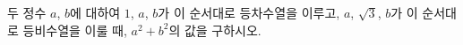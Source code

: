 두 정수 $a$, $b$에 대하여 $1$, $a$, $b$가 이 순서대로 등차수열을 이루고, $a$, $\sqrt{3}$, $b$가 이 순서대로 등비수열을 이룰 때, $a^2+b^2$의 값을 구하시오.
